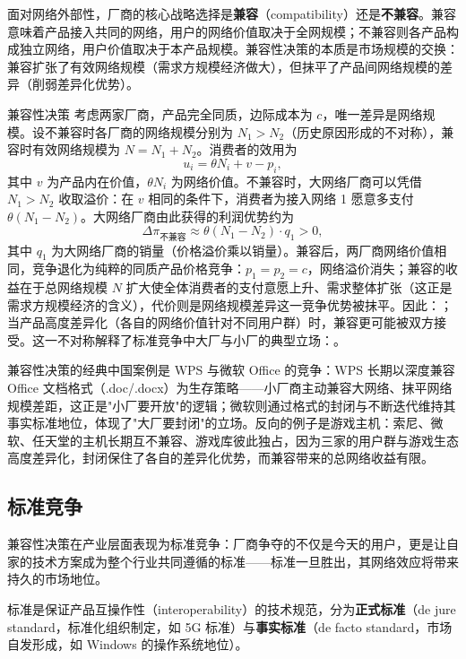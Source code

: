 面对网络外部性，厂商的核心战略选择是\textbf{兼容}（compatibility）还是\textbf{不兼容}。兼容意味着产品接入共同的网络，用户的网络价值取决于全网规模；不兼容则各产品构成独立网络，用户价值取决于本产品规模。兼容性决策的本质是市场规模的交换：兼容扩张了有效网络规模（需求方规模经济做大），但抹平了产品间网络规模的差异（削弱差异化优势）。

\begin{derivation}{兼容性决策}{}
考虑两家厂商，产品完全同质，边际成本为 $c$，唯一差异是网络规模。设不兼容时各厂商的网络规模分别为 $N_1 > N_2$（历史原因形成的不对称），兼容时有效网络规模为 $N = N_1 + N_2$。消费者的效用为
\[
u_i = \theta N_i + v - p_i,
\]
其中 $v$ 为产品内在价值，$\theta N_i$ 为网络价值。不兼容时，大网络厂商可以凭借 $N_1 > N_2$ 收取溢价：在 $v$ 相同的条件下，消费者为接入网络 1 愿意多支付 $\theta(N_1 - N_2)$。大网络厂商由此获得的利润优势约为
\[
\Delta\pi_{\text{不兼容}} \approx \theta(N_1 - N_2) \cdot q_1 > 0,
\]
其中 $q_1$ 为大网络厂商的销量（价格溢价乘以销量）。兼容后，两厂商网络价值相同，竞争退化为纯粹的同质产品价格竞争：$p_1 = p_2 = c$，网络溢价消失；兼容的收益在于总网络规模 $N$ 扩大使全体消费者的支付意愿上升、需求整体扩张（这正是需求方规模经济的含义），代价则是网络规模差异这一竞争优势被抹平。因此：；当产品高度差异化（各自的网络价值针对不同用户群）时，兼容更可能被双方接受。这一不对称解释了标准竞争中大厂与小厂的典型立场：。
\end{derivation}

兼容性决策的经典中国案例是 WPS 与微软 Office 的竞争：WPS 长期以深度兼容 Office 文档格式（.doc/.docx）为生存策略——小厂商主动兼容大网络、抹平网络规模差距，这正是"小厂要开放"的逻辑；微软则通过格式的封闭与不断迭代维持其事实标准地位，体现了"大厂要封闭"的立场。反向的例子是游戏主机：索尼、微软、任天堂的主机长期互不兼容、游戏库彼此独占，因为三家的用户群与游戏生态高度差异化，封闭保住了各自的差异化优势，而兼容带来的总网络收益有限。

\subsection{标准竞争}

兼容性决策在产业层面表现为标准竞争：厂商争夺的不仅是今天的用户，更是让自家的技术方案成为整个行业共同遵循的标准——标准一旦胜出，其网络效应将带来持久的市场地位。

\begin{definition}[标准（standard）]
标准是保证产品互操作性（interoperability）的技术规范，分为\textbf{正式标准}（de jure standard，标准化组织制定，如 5G 标准）与\textbf{事实标准}（de facto standard，市场自发形成，如 Windows 的操作系统地位）。
\end{definition}

